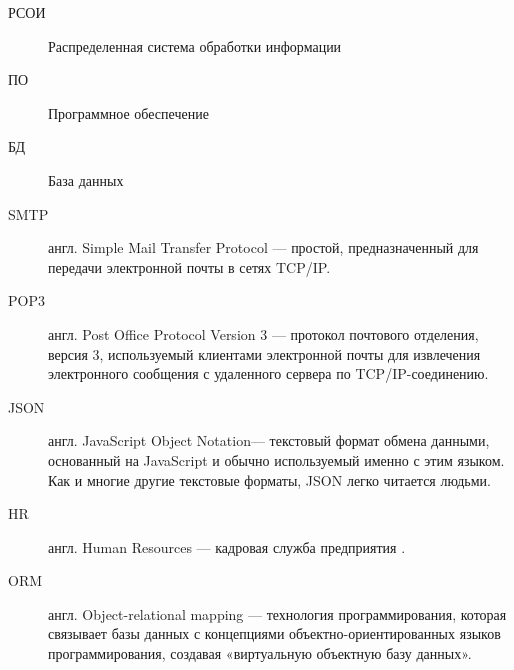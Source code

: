 \Abbreviations %
\begin{description}
\item [РСОИ] Распределенная система обработки информации
\item [ПО] Программное обеспечение
\item [БД] База данных
\item [SMTP] англ. Simple Mail Transfer Protocol — простой, предназначенный для передачи электронной почты в сетях TCP/IP.
\item [POP3] англ. Post Office Protocol Version 3 — протокол почтового отделения, версия 3, используемый клиентами электронной почты для извлечения электронного сообщения с удаленного сервера по TCP/IP-соединению.
\item  [JSON] англ. JavaScript Object Notation— текстовый формат обмена данными, основанный на JavaScript и обычно используемый именно с этим языком. Как и многие другие текстовые форматы, JSON легко читается людьми.
\item  [HR] англ. Human Resources — кадровая служба предприятия .
\item [ORM] англ. Object-relational mapping — технология программирования, которая связывает базы данных с концепциями объектно-ориентированных языков программирования, создавая «виртуальную объектную базу данных».
\end{description}

